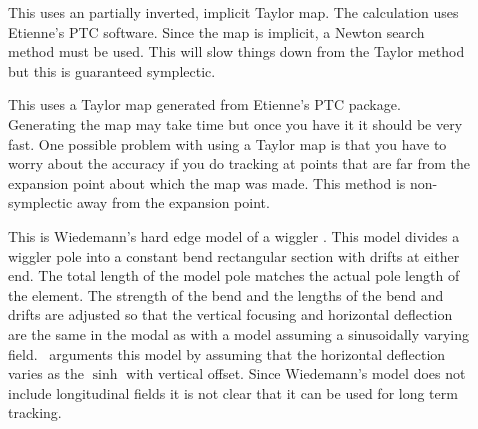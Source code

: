 \begin{description}
\item[]
This uses an partially inverted, implicit Taylor map. The calculation
uses Etienne's PTC software.  Since the map is implicit, a Newton
search method must be used. This will slow things down from the Taylor
method but this is guaranteed symplectic.

\item[]
This uses a Taylor map generated from Etienne's PTC
package. Generating the map may take time but once you have it it
should be very fast. One possible problem with using a Taylor map is
that you have to worry about the accuracy if you do tracking at points
that are far from the expansion point about which the map was
made. This method is non-symplectic away from the expansion point. 

\item[]
This is Wiedemann's hard edge model of a wiggler
\cite{wiedemann}. This model divides a wiggler pole into a constant 
bend rectangular section with drifts at either end. The total length
of the model pole matches the actual pole length of the element. The
strength of the bend and the lengths of the bend and drifts are
adjusted so that the vertical focusing and horizontal deflection are
the same in the modal as with a model assuming a sinusoidally varying
field. \bmad\ arguments this model by assuming that the horizontal
deflection varies as the $\sinh$ with vertical offset.  Since
Wiedemann's model does not include longitudinal fields it is not clear
that it can be used for long term tracking.

\end{description}

\vfill \break

